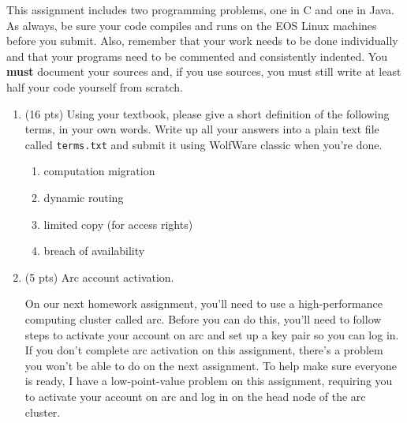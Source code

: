 \documentclass{article}
\begin{document}
\noindent
{}

\vspace{0.1in}

This assignment includes two programming problems, one in C
and one in Java.  As always, be sure your code compiles and
runs on the EOS Linux machines before you submit.  Also, remember that
your work needs to be done individually and that your programs need to
be commented and consistently indented.  You \textbf{must} document
your sources and, if you use sources, you must still write at least
half your code yourself from scratch.

\begin{enumerate}
\item (16 pts) Using your textbook, please give a short definition of
  the following terms, in your own words.  Write up all your answers
  into a plain text file called \texttt{terms.txt} and submit it using
  WolfWare classic when you're done.

\begin{enumerate}
\item computation migration

%

\item dynamic routing

% 

\item limited copy (for access rights)

% 

\item breach of availability

% 

\end{enumerate}

\item (5 pts) Arc account activation.

  On our next homework assignment, you'll need to use a
  high-performance computing cluster called arc.  Before you can do
  this, you'll need to follow steps to activate your account on arc
  and set up a key pair so you can log in.  If you don't complete arc
  activation on this assignment, there's a problem you won't be able
  to do on the next assignment.  To help make sure everyone
  is ready, I have a low-point-value problem on this assignment,
  requiring you to activate your account on arc and log in on the head
  node of the arc cluster.


\end{enumerate}
\end{document}
